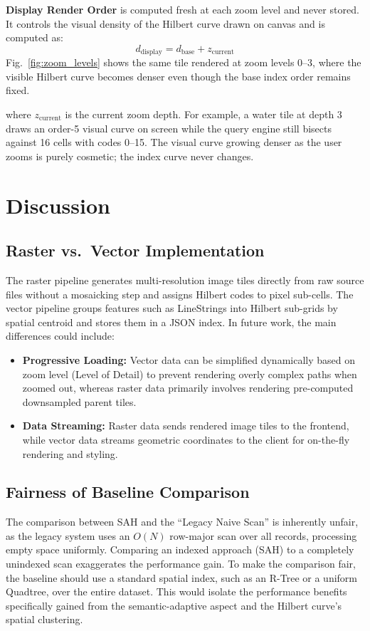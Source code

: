 \documentclass[conference]{IEEEtran}
\begin{document}
\textbf{Display Render Order} is computed fresh at each zoom level and never
stored. It controls the visual density of the Hilbert curve drawn on canvas and is computed as:
\begin{equation}
  d_{\text{display}} = d_{\text{base}} + z_{\text{current}}
  \label{eq:displayorder}
\end{equation}
Fig.~\ref{fig:zoom_levels} shows the same tile rendered at zoom levels 0--3, where the visible Hilbert curve becomes denser even though the base index order remains fixed.

where $z_{\text{current}}$ is the current zoom depth. For example, a water tile at depth 3 draws an order-5 visual curve on screen while the query engine still bisects against 16 cells with codes 0--15. The visual curve growing denser as the user zooms is purely cosmetic; the index curve never changes.

\section{Discussion}

\subsection{Raster vs.\ Vector Implementation}
The raster pipeline generates multi-resolution image tiles directly from raw source files without a mosaicking step and assigns Hilbert codes to pixel sub-cells. The vector pipeline groups features such as LineStrings into Hilbert sub-grids by spatial centroid and stores them in a JSON index. In future work, the main differences could include:
\begin{itemize}
  \item \textbf{Progressive Loading:} Vector data can be simplified dynamically based on zoom level (Level of Detail) to prevent rendering overly complex paths when zoomed out, whereas raster data primarily involves rendering pre-computed downsampled parent tiles.
  \item \textbf{Data Streaming:} Raster data sends rendered image tiles to the frontend, while vector data streams geometric coordinates to the client for on-the-fly rendering and styling.
\end{itemize}

\subsection{Fairness of Baseline Comparison}
The comparison between SAH and the ``Legacy Naive Scan'' is inherently unfair, as the legacy system uses an $O(N)$ row-major scan over all records, processing empty space uniformly. Comparing an indexed approach (SAH) to a completely unindexed scan exaggerates the performance gain. To make the comparison fair, the baseline should use a standard spatial index, such as an R-Tree or a uniform Quadtree, over the entire dataset. This would isolate the performance benefits specifically gained from the semantic-adaptive aspect and the Hilbert curve's spatial clustering.
\end{document}
